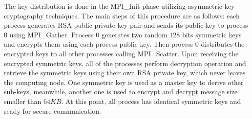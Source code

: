 The key distribution is done in the MPI\_Init phase utilizing asymmetric key 
cryptography techniques. The main steps of this procedure are as follows:
each process generates RSA public-private key pair and sends its public key 
to process $0$ using MPI\_Gather. Process $0$ generates two random $128$ bits
 symmetric keys and encrypts them using each process public key. Then process 
 $0$ distributes the encrypted keys to all other processes calling MPI\_Scatter. 
 Upon receiving the encrypted symmetric keys, all of the processes perform 
 decryption operation and retrieve the symmetric keys using their own RSA private
  key, which never leaves the computing node. One symmetric key is used as a master
   key to derive other sub-keys, meanwhile, another one is used to encrypt and decrypt
    message size smaller than $64KB$.
At this point, all process has identical symmetric keys and ready for secure communication.
\fi

  

